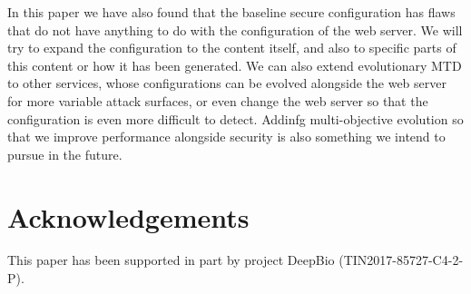\documentclass[sigconf]{acmart}
\begin{document}
In this paper we have also found that the baseline secure
configuration has flaws that do not have anything to do with the
configuration of the web server. We will try to expand the
configuration to the content itself, and also to specific parts of
this content or how it has been generated. We can also extend
evolutionary MTD to other services, whose configurations can be
evolved alongside the web server for more variable attack surfaces, or
even change the web server so that the configuration is even more
difficult to detect. Addinfg multi-objective evolution so that we
improve performance alongside security is also something we intend to
pursue in the future.

\section{Acknowledgements}

This paper has been supported in part by project DeepBio (TIN2017-85727-C4-2-P).



\end{document}
